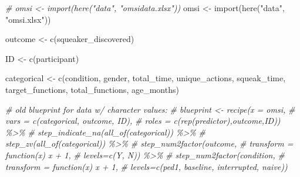 \documentclass[
  english,
  man]{apa6}
\newenvironment{Shaded}{\begin{snugshade}}{\end{snugshade}}
\newcommand{\CommentTok}[1]{\textcolor[rgb]{0.56,0.35,0.01}{\textit{#1}}}
\newcommand{\FunctionTok}[1]{\textcolor[rgb]{0.00,0.00,0.00}{#1}}
\newcommand{\NormalTok}[1]{#1}
\newcommand{\OtherTok}[1]{\textcolor[rgb]{0.56,0.35,0.01}{#1}}
\newcommand{\StringTok}[1]{\textcolor[rgb]{0.31,0.60,0.02}{#1}}
\begin{document}
\begin{Shaded}
\begin{Highlighting}[]
\CommentTok{\# omsi \textless{}{-} import(here("data", "omsidata.xlsx"))}
\NormalTok{omsi }\OtherTok{\textless{}{-}} \FunctionTok{import}\NormalTok{(}\FunctionTok{here}\NormalTok{(}\StringTok{"data"}\NormalTok{, }\StringTok{"omsi.xlsx"}\NormalTok{))}

\NormalTok{outcome }\OtherTok{\textless{}{-}} \FunctionTok{c}\NormalTok{(}\StringTok{\textquotesingle{}squeaker\_discovered\textquotesingle{}}\NormalTok{)}

\NormalTok{ID }\OtherTok{\textless{}{-}} \FunctionTok{c}\NormalTok{(}\StringTok{\textquotesingle{}participant\textquotesingle{}}\NormalTok{)}

\NormalTok{categorical }\OtherTok{\textless{}{-}} \FunctionTok{c}\NormalTok{(}\StringTok{\textquotesingle{}condition\textquotesingle{}}\NormalTok{, }\StringTok{\textquotesingle{}gender\textquotesingle{}}\NormalTok{, }\StringTok{\textquotesingle{}total\_time\textquotesingle{}}\NormalTok{, }\StringTok{\textquotesingle{}unique\_actions\textquotesingle{}}\NormalTok{, }\StringTok{\textquotesingle{}squeak\_time\textquotesingle{}}\NormalTok{, }\StringTok{\textquotesingle{}target\_functions\textquotesingle{}}\NormalTok{, }\StringTok{\textquotesingle{}total\_functions\textquotesingle{}}\NormalTok{, }\StringTok{\textquotesingle{}age\_months\textquotesingle{}}\NormalTok{)}

\CommentTok{\# old blueprint for data w/ character values:}
\CommentTok{\# blueprint \textless{}{-} recipe(x  = omsi,}
\CommentTok{\#                    vars  = c(categorical, outcome, ID),}
\CommentTok{\#                    roles = c(rep(\textquotesingle{}predictor\textquotesingle{}),\textquotesingle{}outcome\textquotesingle{},\textquotesingle{}ID\textquotesingle{})) \%\textgreater{}\%}
\CommentTok{\#  step\_indicate\_na(all\_of(categorical)) \%\textgreater{}\%}
\CommentTok{\#  step\_zv(all\_of(categorical)) \%\textgreater{}\%}
\CommentTok{\#    step\_num2factor(outcome,}
\CommentTok{\#                  transform = function(x) x + 1,}
\CommentTok{\#                  levels=c(\textquotesingle{}Y\textquotesingle{}, \textquotesingle{}N\textquotesingle{})) \%\textgreater{}\%}
\CommentTok{\#  step\_num2factor(condition, }
\CommentTok{\#                  transform = function(x) x + 1,}
\CommentTok{\#                  levels=c(\textquotesingle{}ped1\textquotesingle{}, \textquotesingle{}baseline\textquotesingle{}, \textquotesingle{}interrupted\textquotesingle{}, \textquotesingle{}naive\textquotesingle{}))}
 

\end{Highlighting}
\end{Shaded}
\end{document}
